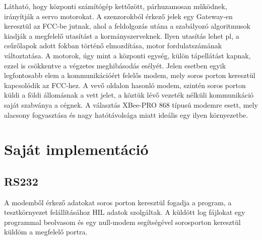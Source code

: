 \documentclass[12pt]{article}
\begin{document}
\begin{itemize}
Látható, hogy központi számítógép kett\H{o}zött, párhuzamosan m\H{u}ködnek, irányítják a servo motorokat. A szenzorokból érkez\H{o} jelek egy Gateway-en keresztül az FCC-be jutnak, ahol a feldolgozás utána a szabályozó algoritmusok kiadják a megfelel\H{o} utasítást a kormányszerveknek. Ilyen utasítás lehet pl, a cs\H{u}r\H{o}lapok adott fokban történ\H{o} elmozdítása, motor fordulatszámának változtatása. A motorok, úgy mint a központi egység, külön tápellátást kapnak, ezzel is csökkentve a végzetes meghibásodás esélyét. Jelen esetben egyik legfontosabb elem a kommunikációért felel\H{o}s modem, mely soros porton keresztül kapcsolódik az FCC-hez. A vev\H{o} oldalon hasonló modem, szintén soros porton küldi a földi állomásnak a vett jelet, a köztük lév\H{o} vezeték nélküli kommunikáció saját szabványa a cégnek. A választás XBee-PRO 868 típusú modemre esett, mely alacsony fogyasztása és nagy hatótávolsága miatt ideális egy ilyen környezetbe.


\begin{figure}[H]
	\centering
	\caption{}
	\label{fig:xbee}
\end{figure}





\section{Saját implementáció}

\subsection{RS232}
A modemb\H{o}l érkez\H{o} adatokat soros porton keresztül fogadja a program, a tesztkörnyezet felállításához HIL adatok szolgáltak. A küldött log fájlokat egy programmal beolvasom és egy \cite{bib:null}null-modem segítségével sorosporton keresztül küldöm a megfelel\H{o} portra. 


\end{itemize}
\end{document}
